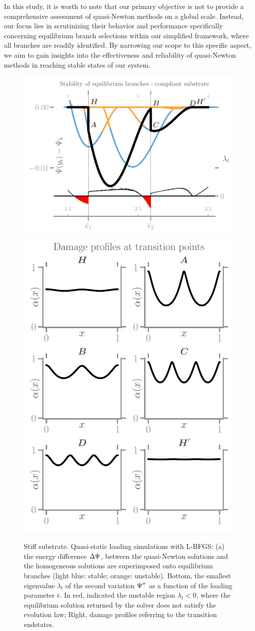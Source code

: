 In  this study, it is worth to note that our primary objective is not to provide a comprehensive assessment of quasi-Newton methods on a global scale. Instead, our focus lies in scrutinizing their behavior and performance specifically concerning equilibrium branch selections within our simplified framework, where all branches are readily identified. By narrowing our scope to this specific aspect, we aim to gain insights into the effectiveness and reliability of quasi-Newton methods in reaching stable states of our system.
\begin{figure}
    \centering
    \hspace*{-.3cm}
\includegraphics[width=.6\textwidth]{../images/model_stiff_energy_kick.pdf}
\includegraphics[width=.4\textwidth]{../images/model_stiff_profiles.pdf}
    \caption{
Stiff substrate. Quasi-static loading simulations with L-BFGS: (a) the energy difference $\Delta \Psi$, between the quasi-Newton solutions and the homogeneous solutions are superimposed onto equilibrium branches (light blue: stable; orange: unstable). Bottom, the smallest eigenvalue $\lambda_t$ of the second variation $\Psi''$ as a function of the loading parameter $\bar\epsilon$. In red, indicated the unstable region $\lambda_t<0$, where the equilibrium solution returned by the solver does not satisfy the evolution law; Right, damage profiles referring to the transition endstates.}
    \label{fig:tempo1}
\end{figure}

